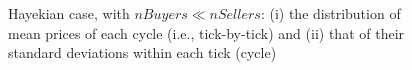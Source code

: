 \documentclass[12pt]{report}
\begin{document}
\begin{appendices}
\begin{figure}[htbp]
\begin{center}
\caption{Hayekian case, with $nBuyers \ll nSellers$: (i) the distribution of mean prices of each cycle (i.e., tick-by-tick) and (ii) that of their standard deviations within each tick (cycle)}
\label{output_3_2b.png}
\end{center}
\end{figure}



\end{appendices}

\clearpage
{}




\clearpage
{}
\printindex
\end{document}
